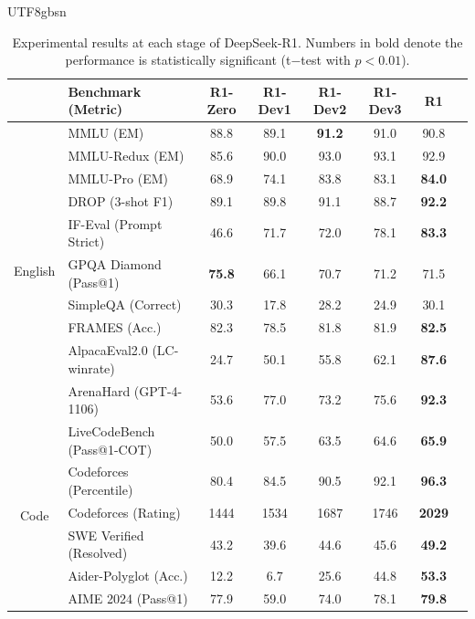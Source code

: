 \documentclass[11pt, a4paper, logo, copyright, nonumbering]{deepseek}
\begin{document}
\begin{CJK*}{UTF8}{gbsn}
\begin{table}[h]
    \centering
    \small
    \setlength{\tabcolsep}{1.9pt}
    \caption{ Experimental results at each stage of DeepSeek-R1. Numbers in bold denote the performance is statistically significant  (t$-$test with $p < 0.01$).}
    \begin{tabular}{@{}c l | c c  c  c |c c@{}}
    \toprule
     & \textbf{Benchmark {\tiny (Metric)}} & \textbf{R1-Zero} & \textbf{R1-Dev1}  & \textbf{R1-Dev2}& \textbf{R1-Dev3} & \textbf{R1} \\
    \midrule
    \multirow{10}{*}{English}& MMLU {\tiny (EM)} & 88.8 & 89.1 & \textbf{91.2} & 91.0  &   90.8\\
     & MMLU-Redux {\tiny (EM)}& 85.6 &90.0 & 93.0 & 93.1 &  92.9 \\
    & MMLU-Pro {\tiny (EM)}  & 68.9 & 74.1 & 83.8 & 83.1 &  \textbf{84.0} \\
    & DROP {\tiny (3-shot F1)}  & 89.1 &89.8 & 91.1 & 88.7  &  \textbf{92.2}\\
    & IF-Eval {\tiny (Prompt Strict)}  & 46.6& 71.7 & 72.0 & 78.1 & \textbf{83.3} \\
    & GPQA Diamond {\tiny (Pass@1)}  & \textbf{75.8} &66.1 & 70.7 &  71.2 &  71.5&  \\
    & SimpleQA {\tiny (Correct)}   & 30.3 & 17.8 & 28.2 & 24.9  &  {30.1} \\
     & FRAMES {\tiny (Acc.)}    & 82.3 & 78.5 & 81.8 & 81.9 &   \textbf{82.5}\\
      & AlpacaEval2.0 {\tiny (LC-winrate)}   & 24.7 & 50.1 & 55.8 & 62.1  &   \textbf{87.6}\\
       & ArenaHard {\tiny (GPT-4-1106)}   & 53.6 & 77.0 & 73.2 & 75.6 &   \textbf{92.3}\\
    \midrule
    \multirow{7}{*}{Code} & LiveCodeBench {\tiny (Pass@1-COT)}   & 50.0 & 57.5&63.5 & 64.6  &   \textbf{65.9} \\
    & Codeforces {\tiny (Percentile)}  & 80.4 & 84.5& 90.5& 92.1  &   \textbf{96.3} \\
    & Codeforces {\tiny (Rating)}  & 1444 &1534 & 1687& 1746  &   \textbf{2029} \\
    & SWE Verified {\tiny (Resolved)}  & 43.2 & 39.6&44.6 &  45.6 &   \textbf{49.2}\\
    & Aider-Polyglot {\tiny (Acc.)}   & 12.2 &6.7 & 25.6&  44.8 &   \textbf{53.3}\\
    \midrule
    \multirow{3}{*}{Math} & AIME 2024 {\tiny (Pass@1)} & 77.9 & 59.0 & 74.0 & 78.1 &   \textbf{79.8} \\

\end{tabular}
\end{table}
\end{CJK*}
\end{document}
